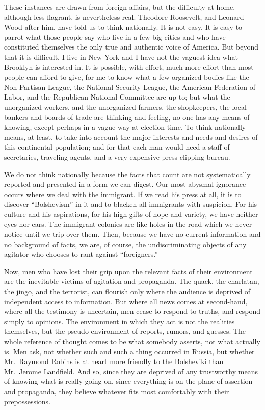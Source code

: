 \documentclass[openany,nobib,nohyper]{tufte-book}
\begin{document}
These instances are drawn from foreign affairs, but the difficulty at
home, although less flagrant, is nevertheless real. Theodore Roosevelt,
and Leonard Wood after him, have told us to think nationally. It is not
easy. It is easy to parrot what those people say who live in a few big
cities and who have constituted themselves the only true and authentic
voice of America. But beyond that it is difficult. I live in New York
and I have not the vaguest idea what Brooklyn is interested in. It is
possible, with effort, much more effort than most people can afford to
give, for me to know what a few organized bodies like the Non-Partisan
League, the National Security League, the American Federation of Labor,
and the Republican National Committee are up to; but what the
unorganized workers, and the unorganized farmers, the shopkeepers, the
local bankers and boards of trade are thinking and feeling, no one has
any means of knowing, except perhaps in a vague way at election time. To
think nationally means, at least, to take into account the major
interests and needs and desires of this continental population; and for
that each man would need a staff of secretaries, traveling agents, and a
very expensive press-clipping bureau.

We do not think nationally because the facts that count are not
systematically reported and presented in a form we can digest. Our most
abysmal ignorance occurs where we deal with the immigrant. If we read
his press at all, it is to discover ``Bolshevism'' in it and to blacken
all immigrants with suspicion. For his culture and his aspirations, for
his high gifts of hope and variety, we have neither eyes nor ears. The
immigrant colonies are like holes in the road which we never notice
until we trip over them. Then, because we have no current information
and no background of facts, we are, of course, the undiscriminating
objects of any agitator who chooses to rant against ``foreigners.''

Now, men who have lost their grip upon the relevant facts of their
environment are the inevitable victims of agitation and propaganda. The
quack, the charlatan, the jingo, and the terrorist, can flourish only
where the audience is deprived of independent access to information. But
where all news comes at second-hand, where all the testimony is
uncertain, men cease to respond to truths, and respond simply to
opinions. The environment in which they act is not the realities
themselves, but the pseudo-environment of reports, rumors, and guesses.
The whole reference of thought comes to be what somebody asserts, not
what actually is. Men ask, not whether such and such a thing occurred in
Russia, but whether Mr.~Raymond Robins is at heart more friendly to the
Bolsheviki than Mr.~Jerome Landfield. And so, since they are deprived of
any trustworthy means of knowing what is really going on, since
everything is on the plane of assertion and propaganda, they believe
whatever fits most comfortably with their prepossessions.
\end{document}
